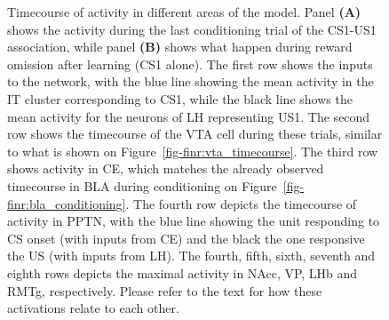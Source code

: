 \documentclass[
  11pt,
  a4paper,
]{scrbook}
\begin{document}
\begin{figure}


\caption{\label{fig-finr:all_timecourse}Timecourse of activity in
different areas of the model. Panel \textbf{(A)} shows the activity
during the last conditioning trial of the CS1-US1 association, while
panel \textbf{(B)} shows what happen during reward omission after
learning (CS1 alone). The first row shows the inputs to the network,
with the blue line showing the mean activity in the IT cluster
corresponding to CS1, while the black line shows the mean activity for
the neurons of LH representing US1. The second row shows the timecourse
of the VTA cell during these trials, similar to what is shown on
Figure~\ref{fig-finr:vta_timecourse}. The third row shows activity in
CE, which matches the already observed timecourse in BLA during
conditioning on Figure~\ref{fig-finr:bla_conditioning}. The fourth row
depicts the timecourse of activity in PPTN, with the blue line showing
the unit responding to CS onset (with inputs from CE) and the black the
one responsive the US (with inputs from LH). The fourth, fifth, sixth,
seventh and eighth rows depicts the maximal activity in NAcc, VP, LHb
and RMTg, respectively. Please refer to the text for how these
activations relate to each other.}

\end{figure}%
\end{document}
